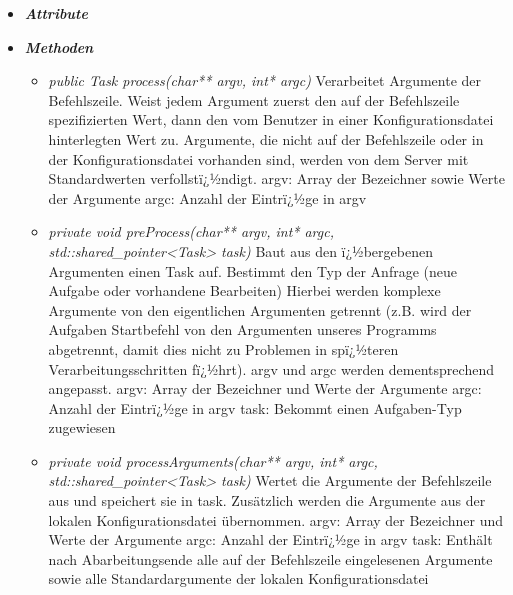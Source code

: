 \documentclass[a4paper,12pt]{article}
\begin{document}
\begin{itemize}[label={}]

	\item \textit{\textbf{Attribute}}
		\begin{itemize}[label={\textbullet}]
		\end{itemize}

	\item \textit{\textbf{Methoden}}
		\begin{itemize}[label={\textbullet}]
			\item \textit{public Task process(char** argv, int* argc)} Verarbeitet Argumente der Befehlszeile.
			Weist jedem Argument zuerst den auf der Befehlszeile spezifizierten Wert, dann den vom Benutzer in einer Konfigurationsdatei hinterlegten Wert zu.
			Argumente, die nicht auf der Befehlszeile oder in der Konfigurationsdatei vorhanden sind, werden von dem Server mit Standardwerten verfollstï¿½ndigt.\newline
			\newline
			argv: Array der Bezeichner sowie Werte der Argumente\newline
			argc: Anzahl der Eintrï¿½ge in argv
			

			\item \textit{private void preProcess(char** argv, int* argc, std::shared_pointer<Task> task)}
			Baut aus den ï¿½bergebenen Argumenten einen Task auf.\newline
			Bestimmt den Typ der Anfrage (neue Aufgabe oder vorhandene Bearbeiten)\newline
			Hierbei werden komplexe Argumente von den eigentlichen Argumenten getrennt (z.B. wird der Aufgaben 	Startbefehl von den Argumenten unseres Programms abgetrennt, damit dies nicht zu Problemen in spï¿½teren
			Verarbeitungsschritten fï¿½hrt).\newline
			argv und argc werden dementsprechend angepasst.\newline
			\newline
			argv: Array der Bezeichner und Werte der Argumente\newline
			argc: Anzahl der Eintrï¿½ge in argv\newline
			task: Bekommt einen Aufgaben-Typ zugewiesen
			
			
			\item \textit{private void processArguments(char** argv, int* argc, std::shared_pointer<Task> task)}
			Wertet die Argumente der Befehlszeile aus und speichert sie in task.\newline
			Zusätzlich werden die Argumente aus der lokalen Konfigurationsdatei übernommen.\newline
			\newline
			argv: Array der Bezeichner und Werte der Argumente\newline
			argc: Anzahl der Eintrï¿½ge in argv\newline
			task: Enthält nach Abarbeitungsende alle auf der Befehlszeile eingelesenen Argumente sowie alle Standardargumente der lokalen Konfigurationsdatei
			
			
		\end{itemize}


\end{itemize}
\end{document}
